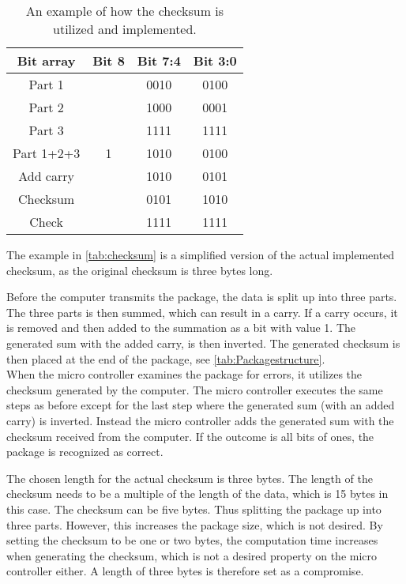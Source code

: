 \begin{table}[H]
\centering
\begin{tabular}{|c|c|c|c|}
\hline
Bit array  & Bit 8                 & \multicolumn{1}{l|}{Bit 7:4} & Bit 3:0 \\ \hline
Part 1     &                       & 0010                         & 0100    \\ \hline
Part 2     &                       & 1000                         & 0001    \\ \hline
Part 3     &                       & 1111                         & 1111    \\ \hline
Part 1+2+3 & 1                     & 1010                         & 0100    \\ \hline
Add carry  & \multicolumn{1}{l|}{} & 1010                         & 0101    \\ \hline
Checksum   & \multicolumn{1}{l|}{} & 0101                         & 1010    \\ \hline
Check      & \multicolumn{1}{l|}{} & 1111                         & 1111    \\ \hline
\end{tabular}
\caption{An example of how the checksum is utilized and implemented.}
\label{tab:checksum}
\end{table}
The example in \autoref{tab:checksum} is a simplified version of the actual implemented checksum, as the original checksum is three bytes long.

Before the computer transmits the package, the data is split up into three parts. The three parts is then summed, which can result in a carry. If a carry occurs, it is removed and then added to the summation as a bit with value 1. The generated sum with the added carry, is then inverted. The generated checksum is then placed at the end of the package, see \autoref{tab:Packagestructure}.\\ 
When the micro controller examines the package for errors, it utilizes the checksum generated by the computer. The micro controller executes the same steps as before except for the last step where the generated sum (with an added carry) is inverted. Instead the micro controller adds the generated sum with the checksum received from the computer. If the outcome is all bits of ones, the package is recognized as correct.

The chosen length for the actual checksum is three bytes. The length of the checksum needs to be a multiple of the length of the data, which is 15 bytes in this case. The checksum can be five bytes. Thus splitting the package up into three parts. However, this increases the package size, which is not desired. By setting the checksum to be one or two bytes, the computation time increases when generating the checksum, which is not a desired property on the micro controller either. A length of three bytes is therefore set as a compromise.

